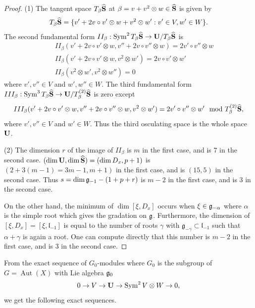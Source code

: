 \documentclass[12pt]{amsart}
\theoremstyle{plain}
\theoremstyle{definition}
\def\Sym{\operatorname{Sym}}
\def\Aut{\operatorname{Aut}}
\begin{document}
\begin{proof}
 (1) The tangent space $T_{\beta} \widehat{\bf S}$ at $\beta = v + v^2 \otimes w \in \widehat{\bf S} $ is given by
$$T_{\beta}\widehat{{\bf S}} = \{ v' + 2 v \circ v' \otimes w + v^2 \otimes w': v' \in V, w' \in W\}.$$
The second fundamental form $II_{\beta} : \Sym^2 T_{\beta}\widehat{{\bf S}} \rightarrow {\bf U} /T_{\beta}\widehat{{\bf S}}$ is
\begin{eqnarray*}
&& II_{\beta}(v' + 2v \circ v' \otimes w, v'' + 2 v\circ v'' \otimes w) = 2v' \circ v'' \otimes w \\
&& II_{\beta}(v' + 2v \circ v' \otimes w, v^2 \otimes w') = 2 v \circ v' \otimes w' \\
&& II_{\beta}(v^2 \otimes w', v^2 \otimes w'')=0
\end{eqnarray*}
where $v',v'' \in V$ and $w', w'' \in W$. The third fundamental form $III_{\beta} : \Sym^3 T_{\beta}\widehat{{\bf S}} \rightarrow {\bf U} /T_{\beta}^{(2)}\widehat{{\bf S}}$ is zero except
$$III_{\beta}(v' + 2 v\circ v' \otimes w, v'' + 2 v \circ v'' \otimes w, v^2 \otimes w') = 2 v' \circ v'' \otimes w' \mod T_{\beta}^{(2)}\widehat{{\bf S}}, $$
where $v',v'' \in V$ and $w' \in W$.
Thus the third osculating space is the whole space $\bf U$.

(2) The dimension $r$ of the image of $II_{\beta}$ is $m$ in the first case, and is $7$ in the second case. $(\dim{\bf{U}}, \dim\widehat{{\bf S}})=(\dim D_x, p+1)$ is $(2+3(m-1)=3m-1,m+1)$ in the first case, and is $(15, 5)$ in the second case. Thus $s=\dim {\frak g_{-1}} -(1+p+r)$ is $ m-2 $ in the first case, and is $ 3$ in the second case.

On the other hand, the minimum of $\dim [\xi, D_x]$ occurs when $\xi \in \frak g _{-\alpha}$ where $\alpha$ is the simple root which gives the gradation on $\frak g$. Furthermore, the dimension of $[\xi , D_x]=[\xi , \mathfrak l_{-1}]$  is equal to the number of roots $\gamma$ with $\mathfrak g_{-\gamma} \subset  \mathfrak l_{-1}$ such that $\alpha + \gamma$ is again a root. One can compute directly that this number is  $m-2 $ in the first case, and is $3$ in the second case.
\end{proof}

From the exact sequence of $G_0$-modules where $G_0$ is the subgroup of $G=\Aut(X)$ with Lie algebra $\frak g_0$
$$0 \rightarrow V \rightarrow {\bf U} \rightarrow \Sym^2V \otimes W \rightarrow 0, $$
we get the following exact sequences.
\end{document}

